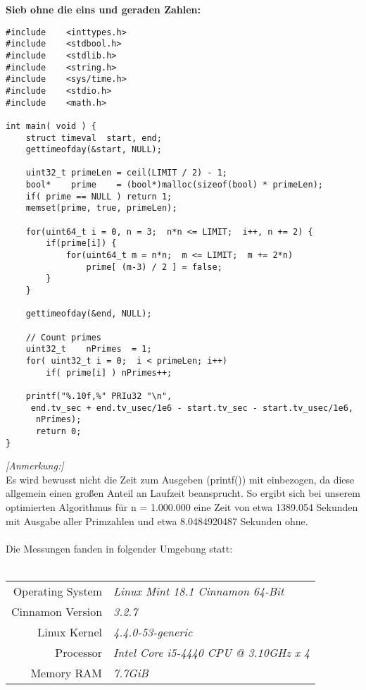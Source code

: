 \documentclass[a4paper,12pt]{article}
\begin{document}
\newpage
\noindent \textbf{Sieb ohne die eins und geraden Zahlen:}
\begin{verbatim}
#include    <inttypes.h>
#include    <stdbool.h>
#include    <stdlib.h>
#include    <string.h>
#include    <sys/time.h>
#include    <stdio.h>
#include    <math.h>

int main( void ) {
    struct timeval  start, end;
    gettimeofday(&start, NULL);

    uint32_t primeLen = ceil(LIMIT / 2) - 1;
    bool*    prime    = (bool*)malloc(sizeof(bool) * primeLen);
    if( prime == NULL ) return 1;
	memset(prime, true, primeLen);

    for(uint64_t i = 0, n = 3;  n*n <= LIMIT;  i++, n += 2) {
        if(prime[i]) {
            for(uint64_t m = n*n;  m <= LIMIT;  m += 2*n)
			    prime[ (m-3) / 2 ] = false;
        }
    }

    gettimeofday(&end, NULL);
    
    // Count primes
    uint32_t    nPrimes  = 1;
    for( uint32_t i = 0;  i < primeLen; i++)
        if( prime[i] ) nPrimes++;
    
    printf("%.10f,%" PRIu32 "\n", 
     end.tv_sec + end.tv_usec/1e6 - start.tv_sec - start.tv_usec/1e6, 
      nPrimes);
      return 0;
}
\end{verbatim}
\newpage
\noindent \textit{[Anmerkung:]}\\
Es wird bewusst nicht die Zeit zum Ausgeben (printf()) mit einbezogen, da diese allgemein einen großen Anteil an Laufzeit beansprucht. So ergibt sich bei unserem optimierten Algorithmus für n = 1.000.000 eine Zeit von etwa 1389.054 Sekunden mit Ausgabe aller Primzahlen und etwa 8.0484920487 Sekunden ohne.\\\\

\noindent Die Messungen fanden in folgender Umgebung statt:\\\\
\begin{tabular}{|r|l|}
\hline
Operating System & \emph{Linux Mint 18.1 Cinnamon 64-Bit}\\
Cinnamon Version & \emph{3.2.7}\\
Linux Kernel & \emph{4.4.0-53-generic}\\
Processor & \emph{Intel Core i5-4440 CPU @ 3.10GHz x 4}\\
Memory RAM & \emph{7.7GiB}\\
\hline
\end{tabular}\\\\
\end{document}
